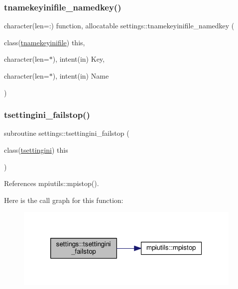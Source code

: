 \subsubsection{\texorpdfstring{tnamekeyinifile\+\_\+namedkey()}{tnamekeyinifile\_namedkey()}}
{\footnotesize\ttfamily character(len=\+:) function, allocatable settings\+::tnamekeyinifile\+\_\+namedkey (\begin{DoxyParamCaption}\item[{class(\mbox{\hyperlink{structsettings_1_1tnamekeyinifile}{tnamekeyinifile}})}]{this,  }\item[{character(len=$\ast$), intent(in)}]{Key,  }\item[{character(len=$\ast$), intent(in)}]{Name }\end{DoxyParamCaption})}

\mbox{\label{namespacesettings_a6535550ffec6e7b81fcb60e053ea87b6}} 
\subsubsection{\texorpdfstring{tsettingini\+\_\+failstop()}{tsettingini\_failstop()}}
{\footnotesize\ttfamily subroutine settings\+::tsettingini\+\_\+failstop (\begin{DoxyParamCaption}\item[{class(\mbox{\hyperlink{structsettings_1_1tsettingini}{tsettingini}})}]{this }\end{DoxyParamCaption})}



References mpiutils\+::mpistop().

Here is the call graph for this function\+:
\nopagebreak
\begin{figure}[H]
\begin{center}
\leavevmode
\includegraphics[width=308pt]{namespacesettings_a6535550ffec6e7b81fcb60e053ea87b6_cgraph}
\end{center}
\end{figure}
\mbox{\label{namespacesettings_aa7bf4212045f11786b51f9cf5fe34ffb}} 
